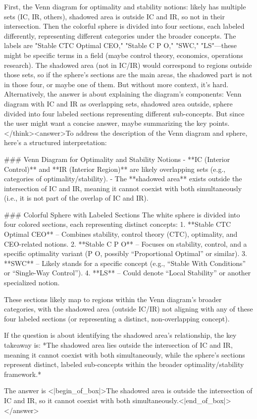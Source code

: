 First, the Venn diagram for optimality and stability notions: likely has multiple sets (IC, IR, others), shadowed area is outside IC and IR, so not in their intersection. Then the colorful sphere is divided into four sections, each labeled differently, representing different categories under the broader concepts. The labels are "Stable CTC Optimal CEO," "Stable C P O," "SWC," "LS"—these might be specific terms in a field (maybe control theory, economics, operations research). The shadowed area (not in IC/IR) would correspond to regions outside those sets, so if the sphere's sections are the main areas, the shadowed part is not in those four, or maybe one of them. But without more context, it's hard. Alternatively, the answer is about explaining the diagram's components: Venn diagram with IC and IR as overlapping sets, shadowed area outside, sphere divided into four labeled sections representing different sub-concepts. But since the user might want a concise answer, maybe summarizing the key points.</think><answer>To address the description of the Venn diagram and sphere, here’s a structured interpretation:  

### Venn Diagram for Optimality and Stability Notions  
- **IC (Interior Control)** and **IR (Interior Region)** are likely overlapping sets (e.g., categories of optimality/stability).  
- The **shadowed area** exists outside the intersection of IC and IR, meaning it cannot coexist with both simultaneously (i.e., it is not part of the overlap of IC and IR).  

### Colorful Sphere with Labeled Sections  
The white sphere is divided into four colored sections, each representing distinct concepts:  
1. **Stable CTC Optimal CEO** – Combines stability, control theory (CTC), optimality, and CEO-related notions.  
2. **Stable C P O** – Focuses on stability, control, and a specific optimality variant (P O, possibly “Proportional Optimal” or similar).  
3. **SWC** – Likely stands for a specific concept (e.g., “Stable With Conditions” or “Single-Way Control”).  
4. **LS** – Could denote “Local Stability” or another specialized notion.  

These sections likely map to regions within the Venn diagram’s broader categories, with the shadowed area (outside IC/IR) not aligning with any of these four labeled sections (or representing a distinct, non-overlapping concept).  

If the question is about identifying the shadowed area’s relationship, the key takeaway is: *The shadowed area lies outside the intersection of IC and IR, meaning it cannot coexist with both simultaneously, while the sphere’s sections represent distinct, labeled sub-concepts within the broader optimality/stability framework.*  

The answer is <|begin_of_box|>The shadowed area is outside the intersection of IC and IR, so it cannot coexist with both simultaneously.<|end_of_box|></answer>